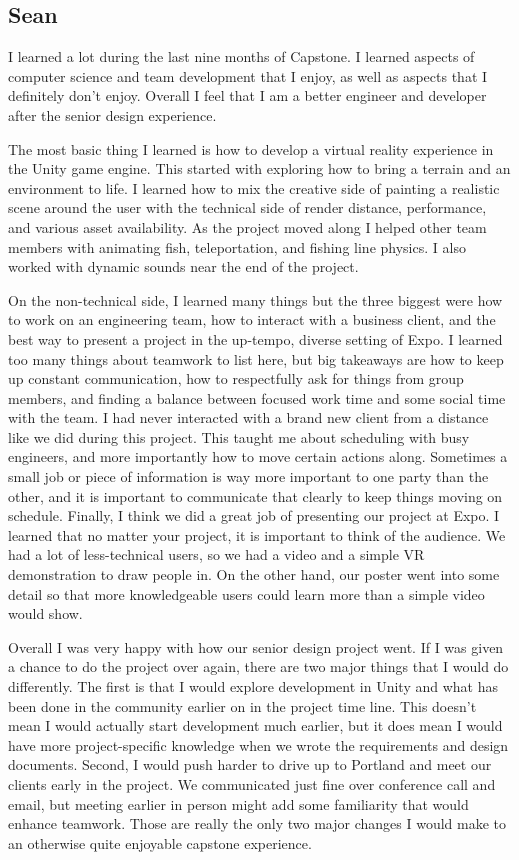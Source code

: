 \documentclass[10pt,journal,compsoc,onecolumn, draftclsnofoot]{IEEEtran}
\begin{document}
\subsection{Sean}
I learned a lot during the last nine months of Capstone. I learned aspects of computer science and team development that I enjoy, as well as aspects that I definitely don't enjoy. Overall I feel that I am a better engineer and developer after the senior design experience.

The most basic thing I learned is how to develop a virtual reality experience in the Unity game engine. This started with exploring how to bring a terrain and an environment to life. I learned how to mix the creative side of painting a realistic scene around the user with the technical side of render distance, performance, and various asset availability. As the project moved along I helped other team members with animating fish, teleportation, and fishing line physics. I also worked with dynamic sounds near the end of the project.

On the non-technical side, I learned many things but the three biggest were how to work on an engineering team, how to interact with a business client, and the best way to present a project in the up-tempo, diverse setting of Expo. I learned too many things about teamwork to list here, but big takeaways are how to keep up constant communication, how to respectfully ask for things from group members, and finding a balance between focused work time and some social time with the team. I had never interacted with a brand new client from a distance like we did during this project. This taught me about scheduling with busy engineers, and more importantly how to move certain actions along. Sometimes a small job or piece of information is way more important to one party than the other, and it is important to communicate that clearly to keep things moving on schedule. Finally, I think we did a great job of presenting our project at Expo. I learned that no matter your project, it is important to think of the audience. We had a lot of less-technical users, so we had a video and a simple VR demonstration to draw people in. On the other hand, our poster went into some detail so that more knowledgeable users could learn more than a simple video would show.

Overall I was very happy with how our senior design project went. If I was given a chance to do the project over again, there are two major things that I would do differently. The first is that I would explore development in Unity and what has been done in the community earlier on in the project time line. This doesn't mean I would actually start development much earlier, but it does mean I would have more project-specific knowledge when we wrote the requirements and design documents. Second, I would push harder to drive up to Portland and meet our clients early in the project. We communicated just fine over conference call and email, but meeting earlier in person might add some familiarity that would enhance teamwork. Those are really the only two major changes I would make to an otherwise quite enjoyable capstone experience.
\end{document}
